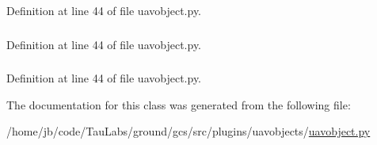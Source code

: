 \-Definition at line 44 of file uavobject.\-py.

\hypertarget{classuavobject_1_1_u_a_v_object_a18e778e490804c6beb88c60b40e6cf70}{
\subsubsection[{name}]{}}\label{classuavobject_1_1_u_a_v_object_a18e778e490804c6beb88c60b40e6cf70}


\-Definition at line 44 of file uavobject.\-py.

\hypertarget{classuavobject_1_1_u_a_v_object_a3b1453f9df2858ac082089867cc91667}{
\subsubsection[{objid}]{}}\label{classuavobject_1_1_u_a_v_object_a3b1453f9df2858ac082089867cc91667}


\-Definition at line 44 of file uavobject.\-py.



\-The documentation for this class was generated from the following file\-:\begin{DoxyCompactItemize}
\item 
/home/jb/code/\-Tau\-Labs/ground/gcs/src/plugins/uavobjects/\hyperlink{uavobject_8py}{uavobject.\-py}\end{DoxyCompactItemize}
